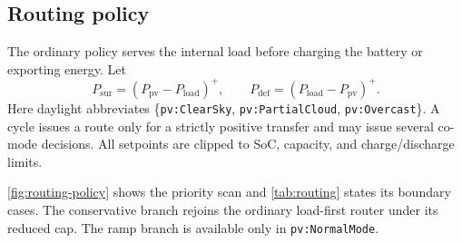 \documentclass[
	letterpaper,
	10pt,
	unnumberedsections,
	twoside,
]{LTJournalArticle}
\newcommand{\valueof}[1]{\texttt{pv:#1}}
\begin{document}
\subsection{Routing policy}

The ordinary policy serves the internal load before charging the battery or exporting energy. Let
\begin{equation}
\label{eq:surplus-deficit}
P_{\mathrm{sur}}=(P_{\mathrm{pv}}-P_{\mathrm{load}})^{+},
\qquad
P_{\mathrm{def}}=(P_{\mathrm{load}}-P_{\mathrm{pv}})^{+}.
\end{equation}
Here daylight abbreviates \{\valueof{ClearSky}, \valueof{PartialCloud}, \valueof{Overcast}\}. A cycle issues a route only for a strictly positive transfer and may issue several co-mode decisions. All setpoints are clipped to SoC, capacity, and charge/discharge limits.

\autoref{fig:routing-policy} shows the priority scan and \autoref{tab:routing} states its boundary cases. The conservative branch rejoins the ordinary load-first router under its reduced cap. The ramp branch is available only in \valueof{NormalMode}.
\end{document}
